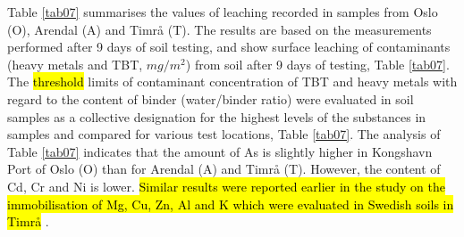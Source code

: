 \documentclass[algorithms,article,submit,pdftex,moreauthors]{Definitions/mdpi}
\begin{document}
Table \ref{tab07} summarises the values of leaching recorded in samples from Oslo (O), Arendal (A) and Timrå (T). The results are based on the measurements performed after 9 days of soil testing, and show surface leaching of contaminants (heavy metals and TBT, $mg/m^2$) from soil after 9 days of testing, Table \ref{tab07}. The \hl{threshold} limits of contaminant concentration of TBT and heavy metals with regard to the content of binder (water/binder ratio) were evaluated in soil samples as a collective designation for the highest levels of the substances in\hl{ }samples and compared for various test locations, Table \ref{tab07}. The analysis of Table \ref{tab07} indicates that the amount of As is slightly higher in Kongshavn Port of Oslo (O)\hl{ }than for Arendal (A) and Timrå (T). However, the content of Cd, Cr and Ni is lower. \hl{Similar results were reported earlier in the study on the immobilisation of Mg, Cu, Zn, Al and K which were evaluated in Swedish soils in Timr\aa } \cite{Nordmark}.
\end{document}
